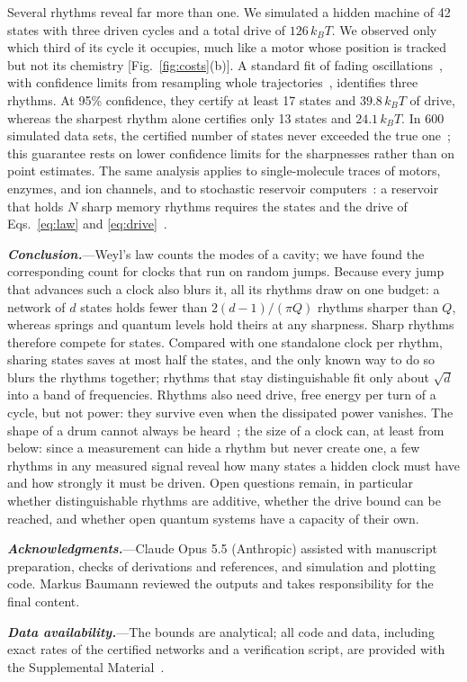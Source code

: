 \documentclass[aps,prl,twocolumn,superscriptaddress,amsmath,amssymb,floatfix,longbibliography]{revtex4-2}
\newcommand{\runin}[1]{\textit{\textbf{#1}}---}
\newcommand{\SM}{\cite{SM}}
\newcommand{\SMsec}[1]{\cite[Sec.~\ref{#1}]{SM}}
\begin{document}
Several rhythms reveal far more than one. We simulated a hidden machine of 42 states with three driven cycles and a total drive of $126\,k_BT$. We observed only which third of its cycle it occupies, much like a motor whose position is tracked but not its chemistry [Fig.~\ref{fig:costs}(b)]. A standard fit of fading oscillations~\cite{hua1990}, with confidence limits from resampling whole trajectories~\cite{efron1979}, identifies three rhythms. At 95\% confidence, they certify at least 17 states and $39.8\,k_BT$ of drive, whereas the sharpest rhythm alone certifies only 13 states and $24.1\,k_BT$. In 600 simulated data sets, the certified number of states never exceeded the true one~\SMsec{sec:protocol}; this guarantee rests on lower confidence limits for the sharpnesses rather than on point estimates. The same analysis applies to single-molecule traces of motors, enzymes, and ion channels, and to stochastic reservoir computers~\cite{ehlers2025}: a reservoir that holds $N$ sharp memory rhythms requires the states and the drive of Eqs.~\eqref{eq:law} and \eqref{eq:drive}~\SMsec{sec:reservoir}.

\runin{Conclusion.}Weyl's law counts the modes of a cavity; we have found the corresponding count for clocks that run on random jumps. Because every jump that advances such a clock also blurs it, all its rhythms draw on one budget: a network of $d$ states holds fewer than $2(d-1)/(\pi Q)$ rhythms sharper than $Q$, whereas springs and quantum levels hold theirs at any sharpness. Sharp rhythms therefore compete for states. Compared with one standalone clock per rhythm, sharing states saves at most half the states, and the only known way to do so blurs the rhythms together; rhythms that stay distinguishable fit only about $\sqrt d$ into a band of frequencies. Rhythms also need drive, free energy per turn of a cycle, but not power: they survive even when the dissipated power vanishes. The shape of a drum cannot always be heard~\cite{gordon1992}; the size of a clock can, at least from below: since a measurement can hide a rhythm but never create one, a few rhythms in any measured signal reveal how many states a hidden clock must have and how strongly it must be driven. Open questions remain, in particular whether distinguishable rhythms are additive, whether the drive bound can be reached, and whether open quantum systems have a capacity of their own.

\runin{Acknowledgments.}Claude Opus 5.5 (Anthropic) assisted with manuscript preparation, checks of derivations and references, and simulation and plotting code. Markus Baumann reviewed the outputs and takes responsibility for the final content.

\runin{Data availability.}The bounds are analytical; all code and data, including exact rates of the certified networks and a verification script, are provided with the Supplemental Material~\SM.

\let\SavedAddContentsLine\addcontentsline\renewcommand{\addcontentsline}[3]{}%

\let\addcontentsline\SavedAddContentsLine


\end{document}
